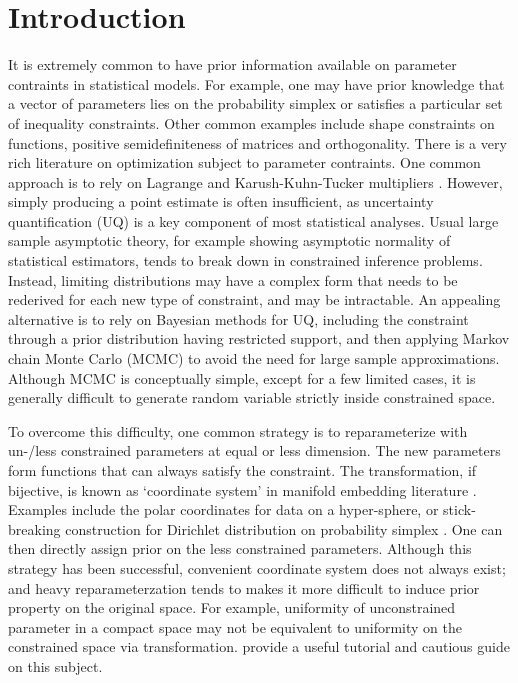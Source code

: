 \documentclass[10pt,fleqn]{article} \pdfoutput=1
\DeclareMathOperator{\1}{\mathbbm{1}} \DeclareMathOperator{\bigO}{\mc O}
\begin{document}
\section{Introduction} It is extremely common to have prior information
available on parameter contraints in statistical models. For example, one
may have prior knowledge that a vector of parameters lies on the
probability simplex or satisfies a particular set of inequality
constraints. Other common examples include shape constraints on functions,
positive semidefiniteness of matrices and orthogonality. There is a very
rich literature on optimization subject to parameter contraints. One common
approach is to rely on Lagrange and Karush-Kuhn-Tucker multipliers
\citep{boyd2004convex}. However, simply producing a point estimate is often
insufficient, as uncertainty quantification (UQ) is a key component of most
statistical analyses. Usual large sample asymptotic theory, for example
showing asymptotic normality of statistical estimators, tends to break down
in constrained inference problems. Instead, limiting distributions may have
a complex form that needs to be rederived for each new type of constraint,
and may be intractable. An appealing alternative is to rely on Bayesian
methods for UQ, including the constraint through a prior distribution
having restricted support, and then applying Markov chain Monte Carlo
(MCMC) to avoid the need for large sample approximations.  Although MCMC is
conceptually simple, except for a few limited cases, it is generally
difficult to generate random variable strictly inside constrained space.

To overcome this difficulty, one common strategy  is to  reparameterize
with un-/less constrained parameters at equal or less dimension. The new
parameters form functions that  can always satisfy the constraint. The
transformation, if bijective,  is known as `coordinate system' in manifold
embedding literature \citep{nash1954c1,do2016differential}. Examples
include the polar coordinates for data on a hyper-sphere, or stick-breaking
construction for Dirichlet distribution on probability simplex
\citep{ishwaran2001gibbs}.  One can then directly assign prior on the less
constrained parameters.  Although this strategy has been successful,
convenient coordinate system does not always exist; and heavy
reparameterzation tends to makes it more difficult to induce prior property
on the original space. For example, uniformity of unconstrained parameter
in a compact space may not be equivalent to uniformity on the constrained
space via transformation. \cite{diaconis2013manifold} provide a useful
tutorial and cautious guide on this subject.
\end{document}
